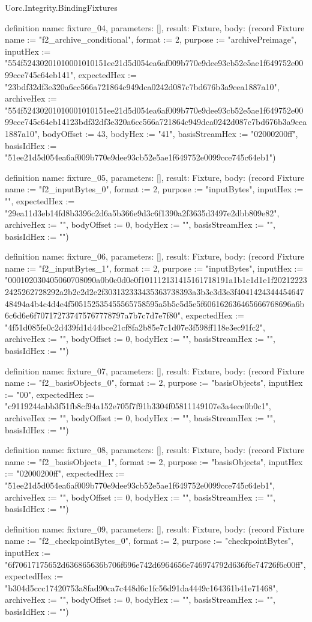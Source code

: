 \begin{lexlean}{Uorc.Integrity.BindingFixtures}
\begin{semanticmodule}
definition{
  name: fixture_04,
  parameters: [],
  result: Fixture,
  body: (record Fixture {name := "f2_archive_conditional", format := 2, purpose := "archivePreimage", inputHex := "554f52430201010001010151ee21d5d054ea6af009b770e9dee93cb52e5ae1f649752e0099cce745c64eb141", expectedHex := "23bdf32df3e320a6cc566a721864c949dca0242d087c7bd676b3a9cea1887a10", archiveHex := "554f52430201010001010151ee21d5d054ea6af009b770e9dee93cb52e5ae1f649752e0099cce745c64eb14123bdf32df3e320a6cc566a721864c949dca0242d087c7bd676b3a9cea1887a10", bodyOffset := 43, bodyHex := "41", basisStreamHex := "02000200ff", basisIdHex := "51ee21d5d054ea6af009b770e9dee93cb52e5ae1f649752e0099cce745c64eb1"})
}

definition{
  name: fixture_05,
  parameters: [],
  result: Fixture,
  body: (record Fixture {name := "f2_inputBytes_0", format := 2, purpose := "inputBytes", inputHex := "", expectedHex := "29ea11d3eb14fd8b3396c2d6a5b366e9d3c6f1390a2f3635d3497e2dbb809e82", archiveHex := "", bodyOffset := 0, bodyHex := "", basisStreamHex := "", basisIdHex := ""})
}

definition{
  name: fixture_06,
  parameters: [],
  result: Fixture,
  body: (record Fixture {name := "f2_inputBytes_1", format := 2, purpose := "inputBytes", inputHex := "000102030405060708090a0b0c0d0e0f101112131415161718191a1b1c1d1e1f202122232425262728292a2b2c2d2e2f303132333435363738393a3b3c3d3e3f404142434445464748494a4b4c4d4e4f505152535455565758595a5b5c5d5e5f606162636465666768696a6b6c6d6e6f707172737475767778797a7b7c7d7e7f80", expectedHex := "4f51d085fe0c2d439fd1d44bce21cf8fa2b85e7c1d07e3f598ff118e3ec91fc2", archiveHex := "", bodyOffset := 0, bodyHex := "", basisStreamHex := "", basisIdHex := ""})
}

definition{
  name: fixture_07,
  parameters: [],
  result: Fixture,
  body: (record Fixture {name := "f2_basisObjects_0", format := 2, purpose := "basisObjects", inputHex := "00", expectedHex := "c9119244abb3f51fb8cf94a152e705f7f91b3304f05811149107e3a4ece0b0c1", archiveHex := "", bodyOffset := 0, bodyHex := "", basisStreamHex := "", basisIdHex := ""})
}

definition{
  name: fixture_08,
  parameters: [],
  result: Fixture,
  body: (record Fixture {name := "f2_basisObjects_1", format := 2, purpose := "basisObjects", inputHex := "02000200ff", expectedHex := "51ee21d5d054ea6af009b770e9dee93cb52e5ae1f649752e0099cce745c64eb1", archiveHex := "", bodyOffset := 0, bodyHex := "", basisStreamHex := "", basisIdHex := ""})
}

definition{
  name: fixture_09,
  parameters: [],
  result: Fixture,
  body: (record Fixture {name := "f2_checkpointBytes_0", format := 2, purpose := "checkpointBytes", inputHex := "6f70617175652d636865636b706f696e742d6964656e746974792d636f6e74726f6c00ff", expectedHex := "b304d5ccc17420753a8fad90ca7c448d6c1fc56d91da4449c164361b41e71468", archiveHex := "", bodyOffset := 0, bodyHex := "", basisStreamHex := "", basisIdHex := ""})
}


\end{semanticmodule}
\end{lexlean}
